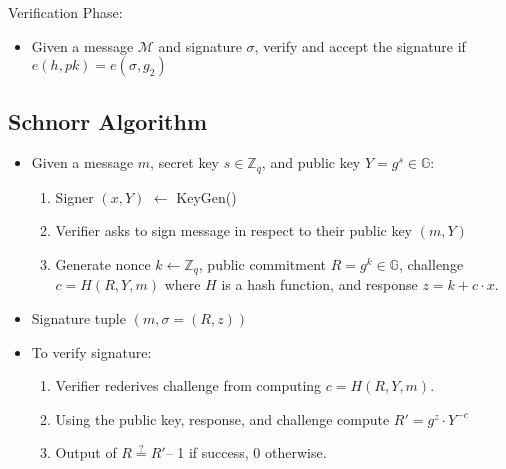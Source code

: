 \documentclass[12pt]{article}
\begin{document}
Verification Phase:
\begin{itemize}
    \item Given a message \( \mathcal{M} \) and signature \( \sigma \), verify and accept the signature if 
    \( e(h, pk) = e(\sigma, g_2) \)
\end{itemize}

\subsection{Schnorr Algorithm}\label{subsec:schnorr}

\begin{itemize}
    \item Given a message \(m\), secret key \(s \in \mathbb{Z}_q\), and public key \(Y = g^s \in \mathbb{G}\):
    \begin{enumerate}
        \item Signer \( (x, Y)\) \( \leftarrow\) KeyGen()
        \item Verifier asks to sign message in respect to their public key \( (m, Y)\)
        \item Generate nonce \( k \leftarrow \mathbb{Z}_q \), public commitment \(R = g^k \in \mathbb{G}\), challenge \(c =H(R, Y, m)\) where \(H\) is a hash function, and response \(z =k+c \cdot x\).
    \end{enumerate}
    \item Signature tuple \( (m, \sigma = (R, z))\)
    \item To verify signature:
    \begin{enumerate}
        \item Verifier rederives challenge from computing \(c= H( R, Y, m)\).
        \item Using the public key, response, and challenge compute \( R'= g^z \cdot Y^{-c}\)
        \item Output of \( R \stackrel{?}{=} R'\)-- 1 if success, 0 otherwise.
    \end{enumerate}
\end{itemize}
\end{document}
